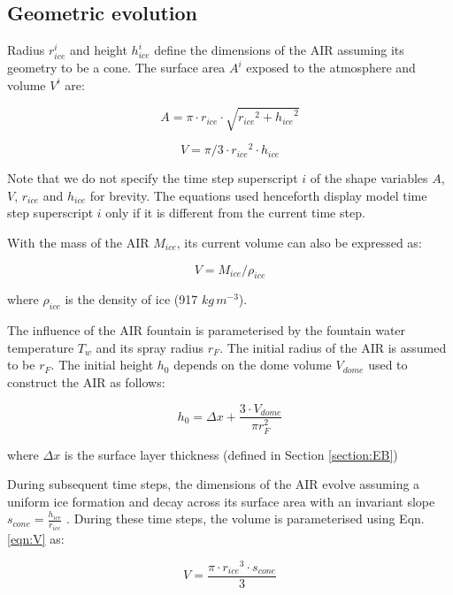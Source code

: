 \documentclass[utf8]{frontiersSCNS} %
\begin{document}
\subsection{Geometric evolution}

Radius $r_{ice}^i$ and height $h_{ice}^i$ define the dimensions of the AIR assuming its geometry to be a cone. The
surface area $A^i$ exposed to the atmosphere and volume $V^i$ are:

\begin{equation} A = \pi \cdot r_{ice} \cdot \sqrt{{r_{ice}}^2 + {h_{ice}}^ 2} \label{eqn:A} \end{equation}

\begin{equation} V = \pi/3 \cdot {r_{ice}}^2 \cdot h_{ice} \label{eqn:V} \end{equation}

Note that we do not specify the time step superscript $i$ of the shape variables $A$, $V$, $r_{ice}$ and $h_{ice}$ for
brevity.  The equations used henceforth display model time step superscript $i$ only if it is different from the
current time step.

With the mass of the AIR $M_{ice}$, its current volume can also be expressed as:

\begin{equation} V = M_{ice} /\rho_{ice} \label{eqn:V1} \end{equation}

where $\rho_{ice}$ is the density of ice (917 $kg\, m^{-3}$).


The influence of the AIR fountain is parameterised by the fountain water temperature $T_{w}$ and its spray radius $r_F$.
The initial radius of the AIR is assumed to be $r_F$. The initial height $h_0$ depends on the dome volume
$V_{dome}$ used to construct the AIR as follows:

\begin{equation}
	h_{0} =  \Delta x + \frac{3 \cdot V_{dome}}{\pi r_F^2 }
	\label{eqn:h0}
\end{equation}

where $\Delta x$ is the surface layer thickness (defined in Section \ref{section:EB})

During subsequent time steps, the dimensions of the AIR evolve assuming a uniform ice formation and decay across
its surface area with an invariant slope $s_{cone} = \frac{h_{ice}}{r_{ice}}$ .  During
these time steps, the volume is parameterised using Eqn. \ref{eqn:V} as:

\begin{equation} V = \frac{\pi \cdot {r_{ice}}^3
		\cdot s_{cone}}{3} \label{eqn:V2} \end{equation}
\end{document}
